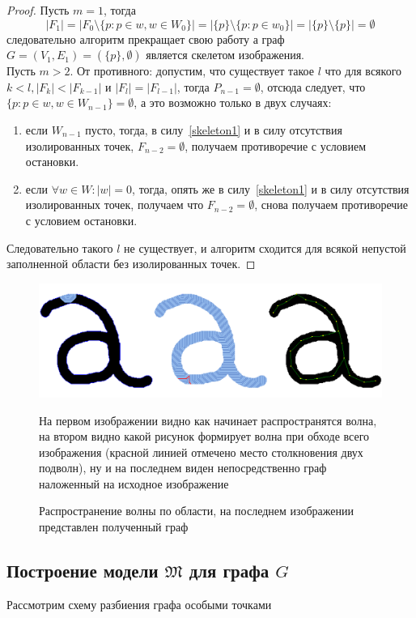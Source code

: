 \begin{proof}
Пусть $m=1$, тогда 
$$|F_1|=|F_0\setminus\{p:p\in w, w\in W_0\}| = |\{p\}\setminus\{p:p\in w_0\}|=|\{p\}\setminus\{p\}|=\emptyset$$
следовательно алгоритм прекращает свою работу а граф $G=(V_1,E_1)=(\{p\},\emptyset)$ является скелетом изображения.\\Пусть $m>2$. От противного: допустим, что существует такое $l$ что для всякого $k<l,|F_{k}| < |F_{k-1}|$ и $|F_{l}|=|F_{l-1}|$, тогда $P_{n-1}=\emptyset$, отсюда следует, что $\{p : p\in w, w \in W_{n-1}\}=\emptyset$, а это возможно только в двух случаях:\\
\begin{enumerate}
\item если $W_{n-1}$ пусто, тогда, в силу~\ref{skeleton1} и в силу отсутствия изолированных точек, $F_{n-2}=\emptyset$, получаем противоречие с условием остановки.\\
\item если $\forall w\in W:|w|=0$, тогда, опять же в силу~\ref{skeleton1} и в силу отсутствия изолированных точек, получаем что $F_{n-2}=\emptyset$, снова получаем противоречие с условием остановки.\\
\end{enumerate}
Следовательно такого $l$ не существует, и алгоритм сходится для всякой непустой заполненной области без изолированных точек.
\end{proof}
\begin{figure}[h]
\centering
\includegraphics[width=\linewidth,keepaspectratio]{images/th_wave_graph}
\caption{Распространение волны по области, на последнем изображении представлен полученный граф}
\medskip
\small На первом изображении видно как начинает распространятся волна, на втором видно какой рисунок формирует волна при обходе всего изображения (красной линией отмечено место столкновения двух подволн), ну и на последнем виден непосредственно граф наложенный на исходное изображение
\end{figure}

\subsection{Построение модели  $\mathfrak{M}$ для графа $G$}
Рассмотрим схему разбиения графа особыми точками

